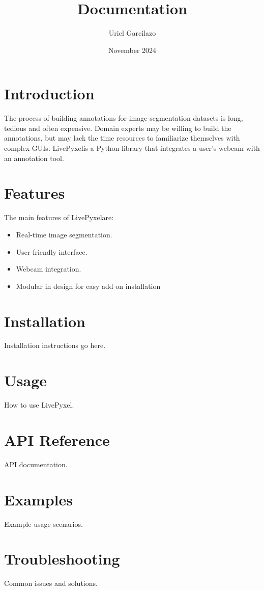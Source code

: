 \documentclass{article}
\title{\progname Documentation}
\author{Uriel Garcilazo}
\date{November 2024}
\newcommand{\progname}{LivePyxel}
\begin{document}
\maketitle

\tableofcontents
\newpage

\section{Introduction}
The process of building annotations for image-segmentation datasets is long, tedious and often expensive.
Domain experts may be willing to build the annotations, but may lack the time resources to familiarize themselves with complex GUIs.
\progname  is a Python library that integrates a user's webcam with an annotation tool. 

\section{Features}
The main features of \progname are:
\begin{itemize}
    \item Real-time image segmentation.
    \item User-friendly interface.
    \item Webcam integration.
    \item Modular in design for easy add on installation
\end{itemize}

\section{Installation}
Installation instructions go here.

\section{Usage}
How to use \progname.

\section{API Reference}
API documentation.

\section{Examples}
Example usage scenarios.

\section{Troubleshooting}
Common issues and solutions.
\end{document}
